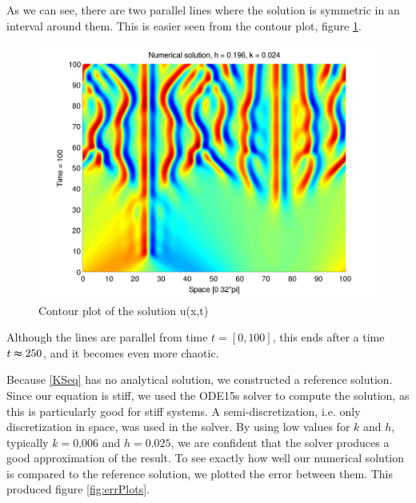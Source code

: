 As we can see, there are two parallel lines where the solution is symmetric in an interval around them. This is easier seen from the contour plot, figure \ref{fig:contour}.

\begin{figure}[H]
\centering
\includegraphics[scale=0.65]
{PDFs/IMEX/KS_plot_contour.pdf}
\caption{Contour plot of the solution u(x,t)}
\label{fig:contour}
\end{figure}

Although the lines are parallel from time $t = [0,100]$, this ends after a time $t \thickapprox 250$, and it becomes even more chaotic.

Because \eqref{KSeq} has no analytical solution, we constructed a reference solution. Since our equation is stiff, we used the ODE15s solver to compute the solution, as this is particularly good for stiff systems. A semi-discretization, i.e. only discretization in space, was used in the solver. By using low values for $k$ and $h$, typically $k = 0.006$ and $h = 0.025$, we are confident that the solver produces a good approximation of the result. To see exactly how well our numerical solution is compared to the reference solution, we plotted the error between them. This produced figure \ref{fig:errPlots}.

